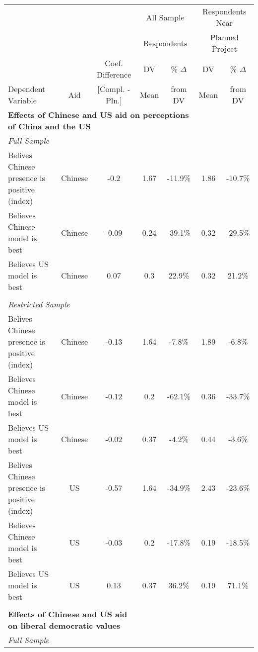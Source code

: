 \begin{tabular}{lcc | cc  | cc} 
   &  &   & \multicolumn{2}{c|}{All Sample} & \multicolumn{2}{c}{Respondents Near} \\ 
   &  &   & \multicolumn{2}{c|}{Respondents} & \multicolumn{2}{c}{Planned Project} \\ 
 \hline 
                     &      & Coef. Difference   & DV   & \% $\Delta$ & DV   & \% $\Delta$ \\ 
  Dependent Variable & Aid  & [Compl. - Pln.]  & Mean & from DV       & Mean & from DV \\ 
 \hline 
 \multicolumn{5}{l|}{\bf Effects of Chinese and US aid on perceptions of China and the US} & \multicolumn{2}{l}{} \\ 
 \multicolumn{3}{l|}{\emph{Full Sample}} & \multicolumn{2}{c|}{} & \multicolumn{2}{c}{} \\ 
Belives Chinese presence is positive (index) & Chinese & -0.2 & 1.67 & -11.9\% & 1.86 & -10.7\% \\ 
 Believes Chinese model is best & Chinese & -0.09 & 0.24 & -39.1\% & 0.32 & -29.5\% \\ 
 Believes US model is best & Chinese & 0.07 & 0.3 & 22.9\% & 0.32 & 21.2\% \\ 
 \multicolumn{3}{l|}{} & \multicolumn{2}{c|}{} & \multicolumn{2}{c}{} \\ 
\multicolumn{3}{l|}{\emph{Restricted Sample}} & \multicolumn{2}{c|}{} & \multicolumn{2}{c}{} \\ 
Belives Chinese presence is positive (index) & Chinese & -0.13 & 1.64 & -7.8\% & 1.89 & -6.8\% \\ 
 Believes Chinese model is best & Chinese & -0.12 & 0.2 & -62.1\% & 0.36 & -33.7\% \\ 
 Believes US model is best & Chinese & -0.02 & 0.37 & -4.2\% & 0.44 & -3.6\% \\ 
 Belives Chinese presence is positive (index) & US & -0.57 & 1.64 & -34.9\% & 2.43 & -23.6\% \\ 
 Believes Chinese model is best & US & -0.03 & 0.2 & -17.8\% & 0.19 & -18.5\% \\ 
 Believes US model is best & US & 0.13 & 0.37 & 36.2\% & 0.19 & 71.1\% \\ 
 \multicolumn{3}{l|}{} & \multicolumn{2}{c|}{} & \multicolumn{2}{c}{} \\ 
\multicolumn{3}{l|}{\bf Effects of Chinese and US aid on liberal democratic values} & \multicolumn{2}{l|}{} & \multicolumn{2}{l}{} \\ 
 \multicolumn{3}{l|}{\emph{Full Sample}} & \multicolumn{2}{c|}{} & \multicolumn{2}{c}{} \\ 

\end{tabular}
